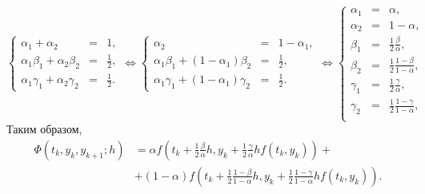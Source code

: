 \documentclass[a4paper,12pt]{article}
\begin{document}
\[
    \left \{
    \begin{array}{rcl}
        \alpha_1 + \alpha_2                   & = & 1 ,           \\
        \alpha_1 \beta_1 + \alpha_2 \beta_2   & = & \frac{1}{2} , \\
        \alpha_1 \gamma_1 + \alpha_2 \gamma_2 & = & \frac{1}{2} .
    \end{array}
    \right .
    \Leftrightarrow
    \left \{
    \begin{array}{rcl}
        \alpha_2                                    & = & 1 - \alpha_1 , \\
        \alpha_1 \beta_1 + (1 - \alpha_1) \beta_2   & = & \frac{1}{2} ,  \\
        \alpha_1 \gamma_1 + (1 - \alpha_1) \gamma_2 & = & \frac{1}{2} .
    \end{array}
    \right .
    \Leftrightarrow
    \left \{
    \begin{array}{rcc}
        \alpha_1 & = & \alpha ,                                  \\
        \alpha_2 & = & 1 - \alpha ,                              \\
        \beta_1  & = & \frac{1}{2} \frac{\beta}{\alpha} ,        \\
        \beta_2  & = & \frac{1}{2} \frac{1 - \beta}{1-\alpha} ,  \\
        \gamma_1 & = & \frac{1}{2} \frac{\gamma}{\alpha} ,       \\
        \gamma_2 & = & \frac{1}{2} \frac{1 - \gamma}{1-\alpha} , \\
    \end{array}
    \right .
\]
Таким образом,
\begin{align*}
    \Phi(t_k, y_k, y_{k+1}; h) & = \alpha f(t_k + \frac{1}{2} \frac{\beta}{\alpha} h, y_k + \frac{1}{2} \frac{\gamma}{\alpha} h f(t_k,y_k)) +                                      \\
                               & + (1 - \alpha) f \left( t_k + \frac{1}{2} \frac{1 - \beta}{1 - \alpha} h, y_k + \frac{1}{2} \frac{1 - \gamma}{1 - \alpha} h f(t_k, y_k) \right) .
\end{align*}
\end{document}
